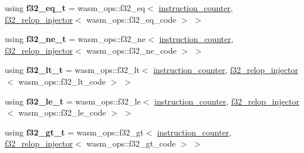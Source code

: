 \begin{DoxyCompactItemize}
using {\bfseries f32\+\_\+eq\+\_\+t} = wasm\+\_\+ops\+::f32\+\_\+eq$<$ \mbox{\hyperlink{structaacio_1_1chain_1_1wasm__injections_1_1instruction__counter}{instruction\+\_\+counter}}, \mbox{\hyperlink{structaacio_1_1chain_1_1wasm__injections_1_1f32__relop__injector}{f32\+\_\+relop\+\_\+injector}}$<$ wasm\+\_\+ops\+::f32\+\_\+eq\+\_\+code $>$ $>$
\item 
\mbox{\label{structaacio_1_1chain_1_1wasm__injections_1_1pre__op__injectors_a6110c7300103036e7a1960476d8e2bc8}} 
using {\bfseries f32\+\_\+ne\+\_\+t} = wasm\+\_\+ops\+::f32\+\_\+ne$<$ \mbox{\hyperlink{structaacio_1_1chain_1_1wasm__injections_1_1instruction__counter}{instruction\+\_\+counter}}, \mbox{\hyperlink{structaacio_1_1chain_1_1wasm__injections_1_1f32__relop__injector}{f32\+\_\+relop\+\_\+injector}}$<$ wasm\+\_\+ops\+::f32\+\_\+ne\+\_\+code $>$ $>$
\item 
\mbox{\label{structaacio_1_1chain_1_1wasm__injections_1_1pre__op__injectors_a7511f6b9f4c44a1847b770eaeb72e026}} 
using {\bfseries f32\+\_\+lt\+\_\+t} = wasm\+\_\+ops\+::f32\+\_\+lt$<$ \mbox{\hyperlink{structaacio_1_1chain_1_1wasm__injections_1_1instruction__counter}{instruction\+\_\+counter}}, \mbox{\hyperlink{structaacio_1_1chain_1_1wasm__injections_1_1f32__relop__injector}{f32\+\_\+relop\+\_\+injector}}$<$ wasm\+\_\+ops\+::f32\+\_\+lt\+\_\+code $>$ $>$
\item 
\mbox{\label{structaacio_1_1chain_1_1wasm__injections_1_1pre__op__injectors_a8992de0b4f6ed2940f28994e8cc71d38}} 
using {\bfseries f32\+\_\+le\+\_\+t} = wasm\+\_\+ops\+::f32\+\_\+le$<$ \mbox{\hyperlink{structaacio_1_1chain_1_1wasm__injections_1_1instruction__counter}{instruction\+\_\+counter}}, \mbox{\hyperlink{structaacio_1_1chain_1_1wasm__injections_1_1f32__relop__injector}{f32\+\_\+relop\+\_\+injector}}$<$ wasm\+\_\+ops\+::f32\+\_\+le\+\_\+code $>$ $>$
\item 
\mbox{\label{structaacio_1_1chain_1_1wasm__injections_1_1pre__op__injectors_af51ab33c8974d5cb81cbdc32e6fd4c97}} 
using {\bfseries f32\+\_\+gt\+\_\+t} = wasm\+\_\+ops\+::f32\+\_\+gt$<$ \mbox{\hyperlink{structaacio_1_1chain_1_1wasm__injections_1_1instruction__counter}{instruction\+\_\+counter}}, \mbox{\hyperlink{structaacio_1_1chain_1_1wasm__injections_1_1f32__relop__injector}{f32\+\_\+relop\+\_\+injector}}$<$ wasm\+\_\+ops\+::f32\+\_\+gt\+\_\+code $>$ $>$

\end{DoxyCompactItemize}
